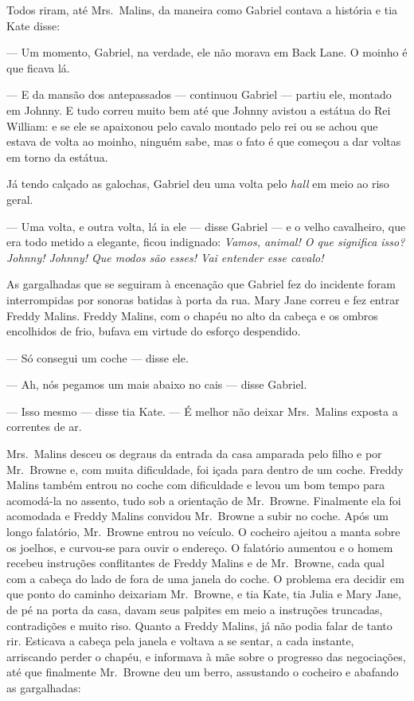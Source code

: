 Todos riram, até Mrs.~Malins, da maneira como Gabriel contava a história e tia
Kate disse:

--- Um momento, Gabriel, na verdade, ele não morava em Back Lane.  O moinho é
que ficava lá.

--- E da mansão dos antepassados --- continuou Gabriel --- partiu ele, montado
em Johnny.  E tudo correu muito bem até que Johnny avistou a estátua do Rei
William: e se ele se apaixonou pelo cavalo montado pelo rei ou se achou que
estava de volta ao moinho, ninguém sabe, mas o fato é que começou a dar voltas
em torno da estátua.

Já tendo calçado as galochas, Gabriel deu uma volta pelo \textit{hall} em meio
ao riso geral.

--- Uma volta, e outra volta, lá ia ele --- disse Gabriel --- e o velho
cavalheiro, que era todo metido a elegante, ficou indignado: \textit{Vamos,
animal!  O que significa isso?  Johnny! Johnny!  Que modos são esses!  Vai entender esse cavalo!}

As gargalhadas que se seguiram à encenação que Gabriel fez do incidente foram
interrompidas por sonoras batidas à porta da rua.  Mary Jane correu e fez
entrar Freddy Malins.  Freddy Malins, com o chapéu no alto da cabeça e os
ombros encolhidos de frio, bufava em virtude do esforço despendido.

--- Só consegui um coche --- disse ele.

--- Ah, nós pegamos um mais abaixo no cais --- disse Gabriel.

--- Isso mesmo --- disse tia Kate.  --- É melhor não deixar Mrs.~Malins exposta
a correntes de ar.

Mrs.~Malins desceu os degraus da entrada da casa amparada pelo filho e por 
Mr.~Browne e, com muita dificuldade, foi içada para dentro de um coche.  Freddy
Malins também entrou no coche com dificuldade e levou um bom tempo para
acomodá-la no assento, tudo sob a orientação de Mr.~Browne.  Finalmente ela
foi acomodada e Freddy Malins convidou Mr.~Browne a subir no coche.  Após um
longo falatório, Mr.~Browne entrou no veículo.  O cocheiro ajeitou a manta
sobre os joelhos, e curvou-se para ouvir o endereço.  O falatório aumentou e o
homem recebeu instruções conflitantes de Freddy Malins e de Mr.~Browne, cada
qual com a cabeça do lado de fora de uma janela do coche.  O problema era
decidir em que ponto do caminho deixariam Mr.~Browne, e tia Kate, tia Julia e
Mary Jane, de pé na porta da casa, davam seus palpites em meio a instruções
truncadas, contradições e muito riso.  Quanto a Freddy Malins, já não podia
falar de tanto rir.  Esticava a cabeça pela janela e voltava a se sentar, a
cada instante, arriscando perder o chapéu, e informava à mãe sobre o progresso
das negociações, até que finalmente Mr.~Browne deu um berro, assustando o
cocheiro e abafando as gargalhadas:

